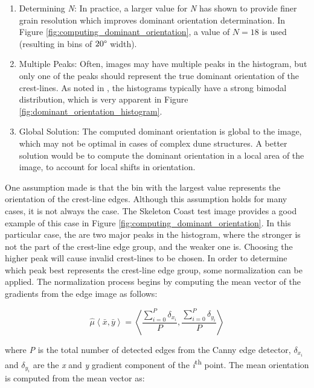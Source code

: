   \begin{enumerate}
  	\item Determining \emph{N}: In practice, a larger value for \emph{N} has shown to provide finer grain resolution which improves dominant orientation determination. In Figure \ref{fig:computing_dominant_orientation}, a value of $N=18$ is used (resulting in bins of $20\degree$ width).
  	\item Multiple Peaks: Often, images may have multiple peaks in the histogram, but only one of the peaks should represent the true dominant orientation of the crest-lines. As noted in \cite{2015_automated_mapping_of_linear_dunefield}, the histograms typically have a strong bimodal distribution, which is very apparent in Figure \ref{fig:dominant_orientation_histogram}.
  	\item Global Solution: The computed dominant orientation is global to the image, which may not be optimal in cases of complex dune structures. A better solution would be to compute the dominant orientation in a local area of the image, to account for local shifts in orientation.
  \end{enumerate}
  
  One assumption made is that the bin with the largest value represents the orientation of the crest-line edges. Although this assumption holds for many cases, it is not always the case. The Skeleton Coast test image provides a good example of this case in Figure \ref{fig:computing_dominant_orientation}. In this particular case, the are two major peaks in the histogram, where the stronger is not the part of the crest-line edge group, and the weaker one is. Choosing the higher peak will cause invalid crest-lines to be chosen. In order to determine which peak best represents the crest-line edge group, some normalization can be applied. The normalization process begins by computing the mean vector of the gradients from the edge image as follows:
  
  \begin{equation}
  \hat{\mu}\left\langle \bar{x},\bar{y}\right\rangle =\left\langle \frac{\sum_{i=0}^{P}\delta_{x_{i}}}{P},\frac{\sum_{i=0}^{P}\delta_{y_{i}}}{P}\right\rangle 
  \end{equation}
  
  where \emph{P} is the total number of detected edges from the Canny edge detector, $\delta_{x_{i}}$ and $\delta_{y_{i}}$ are the \emph{x} and \emph{y} gradient component of the \emph{i}\textsuperscript{th} point. The mean orientation is computed from the mean vector as:
  
